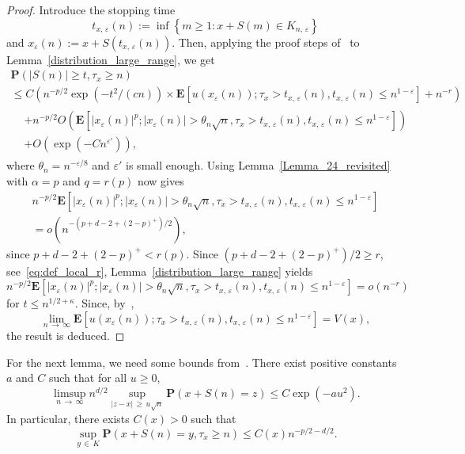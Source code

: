 \documentclass[10pt]{amsart}
\theoremstyle{definition}\newtheorem{defi}[theo]{Definition}\newtheorem{rema}[theo]{Remark}\newtheorem{exam}[theo]{Example}\newtheorem{exem}[theo]{Example}\newtheorem{nota}[theo]{Notation}
\newcommand{\pr}{\mathbf{P}}
\newcommand{\e}{\mathbf{E}}
\renewcommand{\epsilon}{\varepsilon}
\renewcommand{\leq}{\leqslant}
\renewcommand{\geq}{\geqslant}
\begin{document}
\begin{proof}
Introduce the stopping time
\begin{equation}\label{eq:t_x}
t_{x,\,\epsilon}(n):=\inf\left\{m\geq 1:x+S(m)\in {K}_{n,\,\epsilon}\right\}
\end{equation}
and $x_{\epsilon}(n):=x+S(t_{x,\,\epsilon}(n))$. Then, applying the proof steps of~\cite[Section~4]{DeWa-15} to Lemma~\ref{distribution_large_range}, we get
\begin{multline*}
\pr\left(|S(n)| \geq t, \tau_{x}\geq n\right)\\
\leq C\left(n^{-p/2}\exp\left(-t^{2}/(cn)\right)\times
\e\left[u\left(x_{\epsilon}(n)\right);\tau_{x}>t_{x,\,\epsilon}(n),t_{x,\,\epsilon}(n)\leq n^{1-\epsilon}\right]+ n^{-r}\right)\\
\begin{aligned}
&+n^{-p/2}O\left(\e\left[\left|x_{\epsilon}(n)\right|^{p};\left|x_{\epsilon}(n)\right|> \theta_{n}\sqrt{n},\tau_{x}>t_{x,\,\epsilon}(n),t_{x,\,\epsilon}(n)\leq n^{1-\epsilon}\right]\right)\\
&+O\left(\exp\left(-Cn^{\epsilon'}\right)\right),
\end{aligned}
\end{multline*}
where $\theta_{n}=n^{-\epsilon/8}$ and $\epsilon'$ is small enough. Using Lemma~\ref{Lemma_24_revisited} with $\alpha=p$ and $q=r(p)$ now gives
\begin{multline*}
n^{-p/2} \e\left[\left|x_{\epsilon}(n)\right|^{p};\left|x_{\epsilon}(n)\right|> \theta_{n}\sqrt{n},\tau_{x}>t_{x,\,\epsilon}(n),t_{x,\,\epsilon}(n)\leq n^{1-\epsilon}\right]\\
=o\left(n^{-\left(p+d-2+(2-p)^{+}\right)/2}\right),
\end{multline*}
since $p+d-2+(2-p)^{+}<r(p)$. Since $(p+d-2+(2-p)^{+})/2\geq r$, see~\eqref{eq:def_local_r}, Lemma~\ref{distribution_large_range} yields
\[
n^{-p/2}\e\left[\left|x_{\epsilon}(n)\right|^{p};\left|x_{\epsilon}(n)\right|> \theta_{n}\sqrt{n},\tau_{x}>t_{x,\,\epsilon}(n),t_{x,\,\epsilon}(n)\leq n^{1-\epsilon}\right]=o\left(n^{-r}\right)
\]
for $t\leq n^{1/2+\kappa}$. Since, by~\cite[Lemma~21]{DeWa-15},
\[
\lim_{n\,\rightarrow\,\infty}\e\left[u\left(x_{\epsilon}(n)\right);\tau_{x}>t_{x,\,\epsilon}(n),t_{x,\,\epsilon}(n)\leq n^{1-\epsilon}\right]=V(x),
\]
the result is deduced.
\end{proof}

For the next lemma, we need some bounds from~\cite[Lemmas~27 and~29]{DeWa-15}. There exist positive constants $a$ and $C$ such that for all $u\geq 0$,
\begin{equation}\label{bound_local_probability}
\limsup_{n\,\rightarrow\,\infty} n^{d/2}\sup_{|z-x|\,\geq\,u\sqrt{n}}\pr\left(x+S(n)=z\right)\leq C\exp\left(-au^{2}\right).
\end{equation}
In particular, there exists $C(x)>0$ such that
\begin{equation}\label{bound_local_probability_in_cone}
\sup_{y\,\in\,{K}}\pr\left(x+S(n)=y,\tau_{x}\geq n\right)\leq C(x)n^{-p/2-d/2}.
\end{equation}
\end{document}
